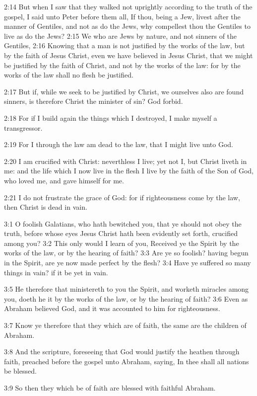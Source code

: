 2:14 But when I saw that they walked not uprightly according to the
truth of the gospel, I said unto Peter before them all, If thou, being
a Jew, livest after the manner of Gentiles, and not as do the Jews,
why compellest thou the Gentiles to live as do the Jews?  2:15 We who
are Jews by nature, and not sinners of the Gentiles, 2:16 Knowing that
a man is not justified by the works of the law, but by the faith of
Jesus Christ, even we have believed in Jesus Christ, that we might be
justified by the faith of Christ, and not by the works of the law: for
by the works of the law shall no flesh be justified.

2:17 But if, while we seek to be justified by Christ, we ourselves
also are found sinners, is therefore Christ the minister of sin? God
forbid.

2:18 For if I build again the things which I destroyed, I make myself
a transgressor.

2:19 For I through the law am dead to the law, that I might live unto
God.

2:20 I am crucified with Christ: neverthless I live; yet not I, but
Christ liveth in me: and the life which I now live in the flesh I live
by the faith of the Son of God, who loved me, and gave himself for me.

2:21 I do not frustrate the grace of God: for if righteousness come by
the law, then Christ is dead in vain.

3:1 O foolish Galatians, who hath bewitched you, that ye should not
obey the truth, before whose eyes Jesus Christ hath been evidently set
forth, crucified among you?  3:2 This only would I learn of you,
Received ye the Spirit by the works of the law, or by the hearing of
faith?  3:3 Are ye so foolish? having begun in the Spirit, are ye now
made perfect by the flesh?  3:4 Have ye suffered so many things in
vain? if it be yet in vain.

3:5 He therefore that ministereth to you the Spirit, and worketh
miracles among you, doeth he it by the works of the law, or by the
hearing of faith?  3:6 Even as Abraham believed God, and it was
accounted to him for righteousness.

3:7 Know ye therefore that they which are of faith, the same are the
children of Abraham.

3:8 And the scripture, foreseeing that God would justify the heathen
through faith, preached before the gospel unto Abraham, saying, In
thee shall all nations be blessed.

3:9 So then they which be of faith are blessed with faithful Abraham.

